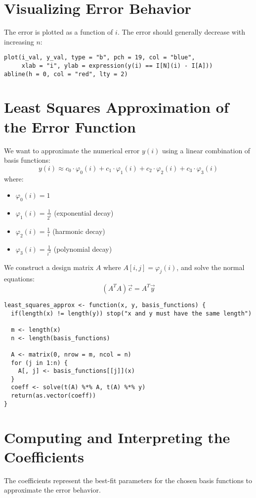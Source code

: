 \documentclass[a4paper,12pt]{article}
\begin{document}
\section{Visualizing Error Behavior}
The error is plotted as a function of $i$. The error should generally decrease with increasing $n$:

\begin{lstlisting}[caption=Plot the numerical error]
plot(i_val, y_val, type = "b", pch = 19, col = "blue",
     xlab = "i", ylab = expression(y(i) == I[N](i) - I[A]))
abline(h = 0, col = "red", lty = 2)
\end{lstlisting}
\newpage
\section{Least Squares Approximation of the Error Function}
We want to approximate the numerical error $y(i)$ using a linear combination of basis functions:
\[ y(i) \approx c_0 \cdot \varphi_0(i) + c_1 \cdot \varphi_1(i) + c_2 \cdot \varphi_2(i) + c_3 \cdot \varphi_3(i) \]
where:
\begin{itemize}
  \item $\varphi_0(i) = 1$
  \item $\varphi_1(i) = \frac{1}{2^i}$ (exponential decay)
  \item $\varphi_2(i) = \frac{1}{i}$ (harmonic decay)
  \item $\varphi_3(i) = \frac{1}{i^2}$ (polynomial decay)
\end{itemize}

We construct a design matrix $A$ where $A[i,j] = \varphi_j(i)$, and solve the normal equations:
\[ (A^T A)\vec{c} = A^T \vec{y} \]

\begin{lstlisting}[caption=Least squares approximation function]
least_squares_approx <- function(x, y, basis_functions) {
  if(length(x) != length(y)) stop("x and y must have the same length")

  m <- length(x)
  n <- length(basis_functions)

  A <- matrix(0, nrow = m, ncol = n)
  for (j in 1:n) {
    A[, j] <- basis_functions[[j]](x)
  }
  coeff <- solve(t(A) %*% A, t(A) %*% y)
  return(as.vector(coeff))
}
\end{lstlisting}

\section{Computing and Interpreting the Coefficients}
The coefficients represent the best-fit parameters for the chosen basis functions to approximate the error behavior.
\end{document}
